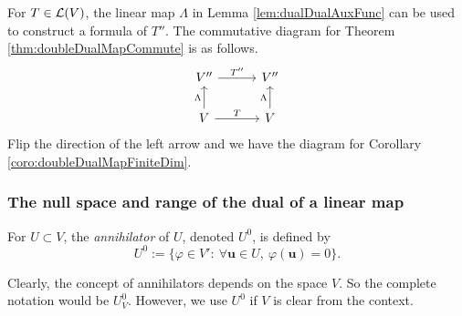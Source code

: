 \begin{rem}
For $T\in {\cal L}(V)$,
   the linear map $\Lambda$ in Lemma \ref{lem:dualDualAuxFunc}
   can be used to construct a formula of $T''$.
  The commutative diagram for Theorem \ref{thm:doubleDualMapCommute}
   is as follows.
   \begin{displaymath}
     \begin{tikzcd}[column sep=3em]
       V'' \ar{r}{T''} 
       & V''
       \\
       V \ar{u}{\Lambda} \ar{r}{T}
       & V \ar{u}{\Lambda} 
     \end{tikzcd}
   \end{displaymath}
  Flip the direction of the left arrow
   and we have the diagram
   for Corollary \ref{coro:doubleDualMapFiniteDim}.
\end{rem}


\subsubsection{The null space and range of the dual of a linear map}

\begin{defn}
  \label{def:annihilator}
  For $U\subset V$,
   the \emph{annihilator} of $U$, denoted $U^0$,
   is defined by
   \begin{equation}
     \label{eq:annihilator}
     U^0 := \{\varphi \in V':\ \forall \mathbf{u}\in U,\ 
     \varphi(\mathbf{u})=0\}.
   \end{equation}
\end{defn}

\begin{rem}
  Clearly, the concept of annihilators depends on the space $V$.
  So the complete notation would be $U_V^0$.
  However, we use $U^0$ if $V$ is clear from the context.
\end{rem}

